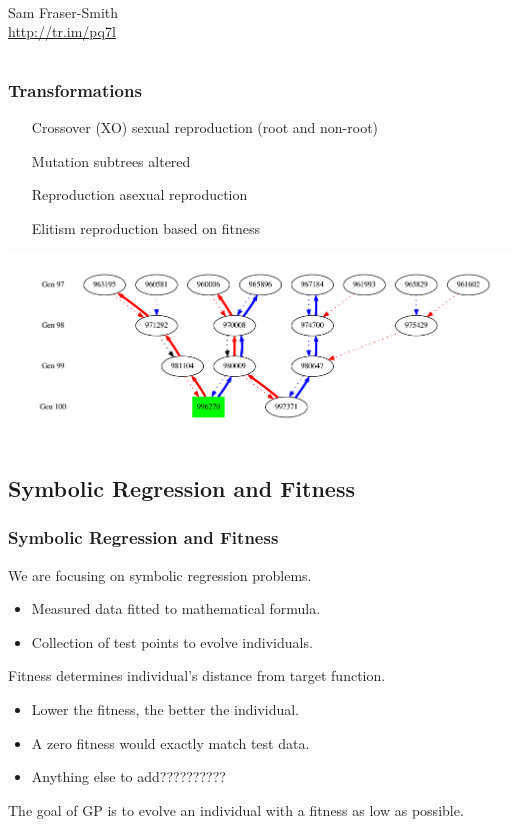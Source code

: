 \documentclass{beamer}
\newcommand{\linespace}{\vskip 0.25cm}
\begin{document}
\begin{frame}
\begin{columns}
\begin{column}{.35\textwidth}
    \\
    \tiny{Sam Fraser-Smith \\ \url{http://tr.im/pq7l} }
  \end{column}
  \end{columns}

\end{frame}

\begin{frame}
  \frametitle{Transformations}

		\begin{itemize}
		\item[Crossover (XO)] sexual reproduction (root and non-root)
		\item[Mutation] subtrees altered
		\item[Reproduction] asexual reproduction
		\item[Elitism] reproduction based on fitness
		\end{itemize}
\includegraphics[width=.95\textwidth]{XO_path_example.pdf}
\end{frame}

\subsection{Symbolic Regression and Fitness}

\begin{frame}
	\frametitle{Symbolic Regression and Fitness}
	
	We are focusing on symbolic regression problems.
	\begin{itemize}
		\item Measured data fitted to mathematical formula.
		\item Collection of test points to evolve individuals.
	\end{itemize}
	
	\linespace
	
	Fitness determines individual's distance from target function.
	\begin{itemize}
		\item Lower the fitness, the better the individual.
		\item A zero fitness would exactly match test data.
		\item Anything else to add??????????
	\end{itemize}
	
	\linespace 
	
	The goal of GP is to evolve an individual with a fitness as low as possible.
	
\end{frame}
\end{document}
